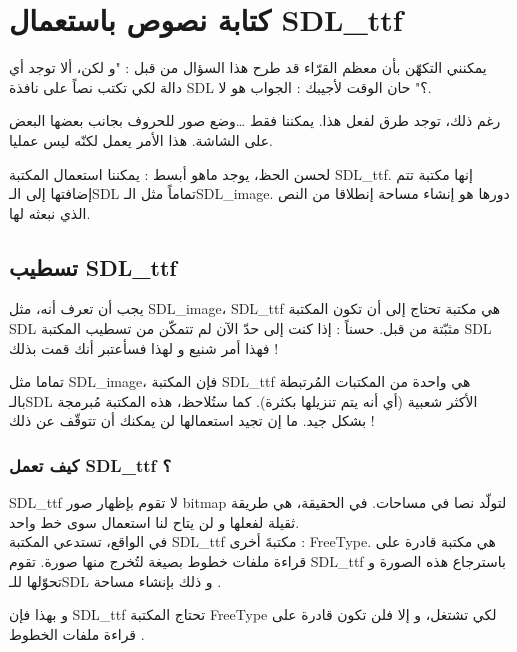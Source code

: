 \chapter{كتابة نصوص باستعمال \textenglish{SDL\_ttf}}

يمكنني التكهّن بأن معظم القرّاء قد طرح هذا السؤال من قبل : "و لكن، ألا توجد أي دالة لكي تكتب نصاً على نافذة
\textenglish{SDL} ؟"
حان الوقت لأجيبك : الجواب هو لا.

رغم ذلك، توجد طرق لفعل هذا. يمكننا فقط \dots وضع صور للحروف بجانب بعضها البعض على الشاشة. هذا الأمر يعمل لكنّه ليس عمليا.

لحسن الحظ، يوجد ماهو أبسط : يمكننا استعمال المكتبة
\textenglish{SDL\_ttf}.
إنها مكتبة تتم إضافتها إلى الـ\textenglish{SDL}
تماماً مثل الـ\textenglish{SDL\_image}.
دورها هو إنشاء مساحة
إنطلاقا من النص الذي نبعثه لها.

\section{تسطيب \textenglish{SDL\_ttf}}

يجب أن تعرف أنه، مثل
\textenglish{SDL\_image}، \textenglish{SDL\_ttf}
هي مكتبة تحتاج إلى أن تكون المكتبة
\textenglish{SDL}
مثبّتة من قبل. حسناً : إذا كنت إلى حدّ الآن لم تتمكّن من تسطيب المكتبة
\textenglish{SDL}
فهذا أمر شنيع و لهذا فسأعتبر أنك قمت بذلك !

تماما مثل 
\textenglish{SDL\_image}،
فإن المكتبة 
\textenglish{SDL\_ttf}
هي واحدة من المكتبات المُرتبطة بالـ\textenglish{SDL}
الأكثر شعبية (أي أنه يتم تنزيلها بكثرة). كما ستُلاحظ، هذه المكتبة مُبرمجة بشكل جيد. ما إن تجيد استعمالها لن يمكنك أن تتوقّف عن ذلك !

\subsection{كيف تعمل \textenglish{SDL\_ttf} ؟}

\textenglish{SDL\_ttf}
لا تقوم بإظهار صور 
\textenglish{bitmap}
لتولّد نصا في مساحات. في الحقيقة، هي طريقة ثقيلة لفعلها و لن يتاح لنا استعمال سوى خط واحد. \\
في الواقع، تستدعي المكتبة
\textenglish{SDL\_ttf}
مكتبةَ أخرى : 
\textenglish{FreeType}.
هي مكتبة قادرة على قراءة ملفات خطوط بصيغة
لتُخرج منها صورة. تقوم
\textenglish{SDL\_ttf}
باسترجاع هذه الصورة و تحوّلها للـ\textenglish{SDL}
و ذلك بإنشاء مساحة
.

و بهذا فإن
\textenglish{SDL\_ttf}
تحتاج المكتبة
\textenglish{FreeType}
لكي تشتغل، و إلا فلن تكون قادرة على قراءة ملفات الخطوط
.

